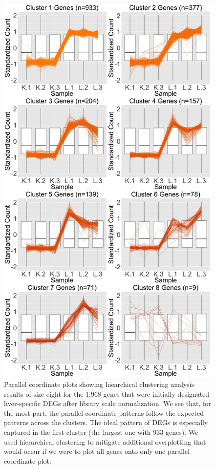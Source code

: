 \documentclass{article}
\begin{document}
\null
\begin{figure}[t!]
\centerline{\includegraphics[width=0.65\columnwidth]{../MakeFigures/lkClustersOrig.jpg}}
\caption{Parallel coordinate plots showing hiearchical clustering analysis results of size eight for the 1,968 genes that were initially designated liver-specific DEGs after library scale normalization. We see that, for the most part, the parallel coordinate patterns follow the expected patterns across the clusters. The ideal pattern of DEGs is especially captured in the first cluster (the largest one with 933 genes). We used hierarchical clustering to mitigate additional overplotting that would occur if we were to plot all genes onto only one parallel coordinate plot.
\label{lkClustersOrig}}
\end{figure}
\end{document}
